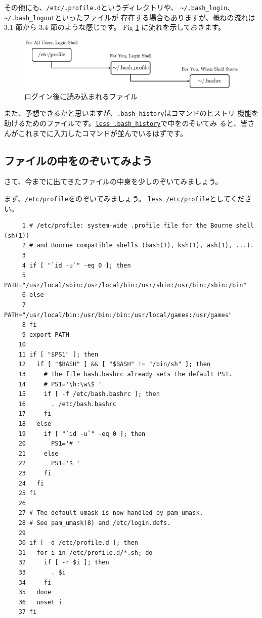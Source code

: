 \documentclass[a4j]{ltjsreport}
\begin{document}
    その他にも、\verb+/etc/.profile.d+というディレクトリや、
    \verb+~/.bash_login+、\verb+~/.bash_logout+といったファイルが
    存在する場合もありますが、概ねの流れは 3.1 節から 3.4 節のような感じです。
    Fig \ref{fig:login} に流れを示しておきます。

    \begin{figure}[htbp]
        \centering
        \includegraphics[width=150mm]{Fig/login.eps}
        \caption{ログイン後に読み込まれるファイル}
        \label{fig:login}
    \end{figure}

    また、予想できるかと思いますが、\verb+.bash_history+はコマンドのヒストリ
    機能を助けるためのファイルです。\underline{\texttt{less .bash\_history}}で中をのぞいてみ
    ると、皆さんがこれまでに入力したコマンドが並んでいるはずです。

    \subsection{ファイルの中をのぞいてみよう}
    さて、今までに出てきたファイルの中身を少しのぞいてみましょう。

    まず、\verb+/etc/profile+をのぞいてみましょう。
    \underline{\texttt{less /etc/profile}}としてください。

    \begin{verbatim}  
     1 # /etc/profile: system-wide .profile file for the Bourne shell (sh(1))
     2 # and Bourne compatible shells (bash(1), ksh(1), ash(1), ...).
     3 
     4 if [ "`id -u`" -eq 0 ]; then
     5   PATH="/usr/local/sbin:/usr/local/bin:/usr/sbin:/usr/bin:/sbin:/bin"
     6 else
     7   PATH="/usr/local/bin:/usr/bin:/bin:/usr/local/games:/usr/games"
     8 fi
     9 export PATH
    10 
    11 if [ "$PS1" ]; then
    12   if [ "$BASH" ] && [ "$BASH" != "/bin/sh" ]; then
    13     # The file bash.bashrc already sets the default PS1.
    14     # PS1='\h:\w\$ '
    15     if [ -f /etc/bash.bashrc ]; then
    16       . /etc/bash.bashrc
    17     fi
    18   else
    19     if [ "`id -u`" -eq 0 ]; then
    20       PS1='# '
    21     else
    22       PS1='$ '
    23     fi
    24   fi
    25 fi
    26 
    27 # The default umask is now handled by pam_umask.
    28 # See pam_umask(8) and /etc/login.defs.
    29 
    30 if [ -d /etc/profile.d ]; then
    31   for i in /etc/profile.d/*.sh; do
    32     if [ -r $i ]; then
    33       . $i
    34     fi
    35   done
    36   unset i
    37 fi
    \end{verbatim}
\end{document}
